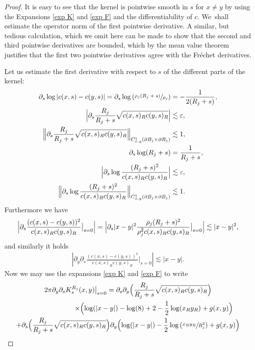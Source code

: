 \documentclass[JEP,XML,SOM,Unicode,published]{cedram}
\let\epsilon\varepsilon
\theoremstyle{definition}
\newcommand\Bnorm[1]{\Bigl\lVert #1\Bigr\rVert}
\newcommand\eq{=}
\let\de\partial
\let\eps\epsilon
\begin{document}
\begin{proof}
It is easy to see that the kernel is pointwise smooth in $s$ for $x\neq y$ by using the Expansions \eqref{exp K} and \eqref{exp F} and the differentiability of $c$. We~shall estimate the operator norm of the first pointwise derivative. A similar, but tedious calculation, which we omit here can be made to show that the second and third pointwise derivatives are bounded, which by the mean value theorem justifies that the first two pointwise derivatives agree with the Fréchet derivatives.

Let us estimate the first derivative with respect to $s$ of the different parts of the kernel:
\begin{align}
\de_s \log |c(x,s)-c(y,s)|\eq\de_s\log\left(\sfrac{\rho_j(R_j+s)}{\rho_j}\right)&\eq-\frac{1}{2(R_j+s)}\label{log c},\\
\Bigl|\de_s\frac{R_j}{R_j+s}\sqrt{c(x,s)_Rc(y,s)_R}\Bigr|&\lesssim \eps\label{deri prefactor 0},\\
\Bnorm{\de_s\frac{R_j}{R_j+s}\sqrt{c(x,s)_Rc(y,s)_R}}_{C_{x,y}^1(\de B_j\times \de B_j)}&\lesssim 1\label{deri prefactor},\\
\de_s\log(R_j+s)&\eq\frac{1}{R_j+s}\label{deri log R 0},\\
\Bigl|\de_s\log \frac{(R_j+s)^2}{c(x,s)_Rc(y,s)_R}\Bigr|&\lesssim \eps\label{deri log R 1},\\
\Bnorm{\de_s\log \frac{(R_j+s)^2}{c(x,s)_Rc(y,s)_R}}_{C_{x,y}^1(\de B_j\times \de B_j)}&\lesssim 1.\label{deri log R}
\end{align}
Furthermore we have
\begin{align}
\Bigl|\de_s\frac{(c(x,s)-c(y,s))^2}{c(x,s)_Rc(y,s)_R}\big|_{s=0}\Bigr| \eq \Bigl |\de_s|x-y|^2\frac{\rho_j(R_j+s)^2}{\rho_j^2c(x,s)_Rc(y,s)_R}\big|_{s=0} \Bigr|\lesssim |x-y|^2,\label{s deri bd}
\end{align}
and similarly it holds
\begin{align}
\left|\de_y\de_s\frac{(c(x,s)-c(y,s))^2}{c(x,s)_Rc(y,s)_R}\big|_{s=0}\right|\lesssim |x-y|.\label{s deri bd 2}
\end{align}
Now we may use the expansions \eqref{exp K} and \eqref{exp F} to write
\begin{multline*}
2\pi\de_y\de_sK_s^{R_j}(x,y)\big|_{s=0}\eq
 \de_s\de_y\Bigl(\frac{R_j}{R_j+s}\sqrt{c(x,s)_Rc(y,s)_R} \Bigr)\\ \shoveright{\times\Bigl(\log(|x-y|)-\log(8)+2-\frac{1}{2}\log(x_Ry_R)+g(x,y) \Bigr)}\\
+\de_s \Bigl(\frac{R_j}{R_j+s}\sqrt{c(x,s)_Rc(y,s)_R} \Bigr)\de_y \Bigl(\log(|x-y|)-\frac{1}{2}\log\left(\sfrac{x_Ry_R}{R_j^2}\right)+g(x,y) \Bigr)\\

\end{multline*}
\end{proof}
\end{document}
